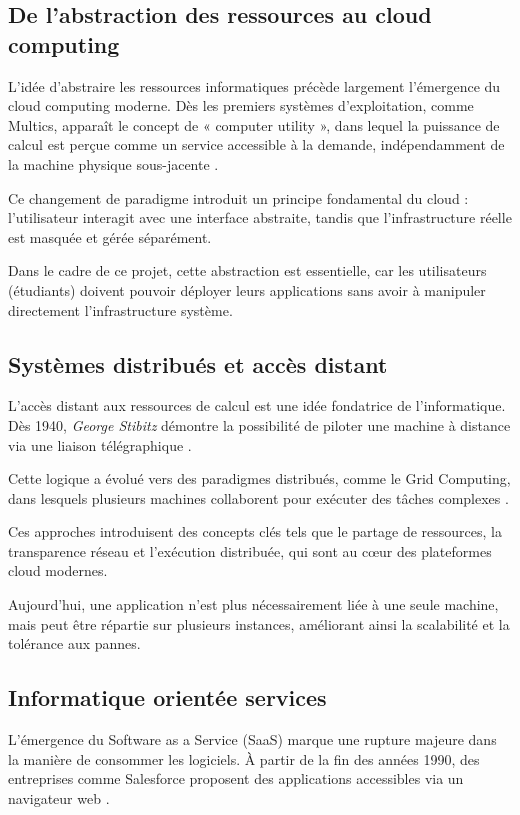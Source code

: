 \documentclass{rapportClass} %
\begin{document}
\subsection{De l’abstraction des ressources au cloud computing}

L’idée d’abstraire les ressources informatiques précède largement
l’émergence du cloud computing moderne. Dès les premiers systèmes
d’exploitation, comme Multics, apparaît le concept de « computer
utility », dans lequel la puissance de calcul est perçue comme un
service accessible à la demande, indépendamment de la machine
physique sous-jacente \cite{Multics1965}.

Ce changement de paradigme introduit un principe fondamental du cloud :
l’utilisateur interagit avec une interface abstraite, tandis que
l’infrastructure réelle est masquée et gérée séparément.

Dans le cadre de ce projet, cette abstraction est essentielle, car les
utilisateurs (étudiants) doivent pouvoir déployer leurs applications
sans avoir à manipuler directement l’infrastructure système.

\subsection{Systèmes distribués et accès distant}

L’accès distant aux ressources de calcul est une idée fondatrice de
l’informatique. Dès 1940, \textit{George Stibitz} démontre la possibilité
de piloter une machine à distance via une liaison télégraphique
\cite{Stibitz2012}.

Cette logique a évolué vers des paradigmes distribués, comme le Grid
Computing, dans lesquels plusieurs machines collaborent pour exécuter
des tâches complexes \cite{Foster2001}.

Ces approches introduisent des concepts clés tels que le partage de
ressources, la transparence réseau et l’exécution distribuée, qui sont
au cœur des plateformes cloud modernes.

Aujourd’hui, une application n’est plus nécessairement liée à une
seule machine, mais peut être répartie sur plusieurs instances,
améliorant ainsi la scalabilité et la tolérance aux pannes.

\subsection{Informatique orientée services}

L’émergence du Software as a Service (SaaS) marque une rupture majeure
dans la manière de consommer les logiciels. À partir de la fin des
années 1990, des entreprises comme Salesforce proposent des
applications accessibles via un navigateur web \cite{Salesforce1999}.
\end{document}
